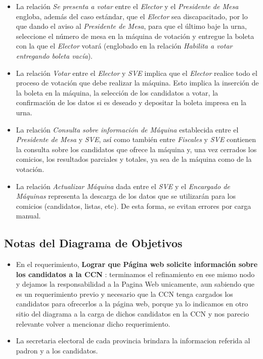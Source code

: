 \documentclass[spanish, 10pt,a4paper]{article}
\numberwithin{equation}{section} %
\begin{document}
\begin{itemize}
\item La relación \textit{Se presenta a votar} entre el \textit{Elector} y el \textit{Presidente de Mesa} engloba, además del caso estándar, que el \textit{Elector} sea discapacitado, por lo que dando el aviso al \textit{Presidente de Mesa}, para que el último baje la urna, seleccione el número de mesa en la máquina de votación y entregue la boleta con la que el \textit{Elector} votará (englobado en la relación \textit{Habilita a votar entregando boleta vacía}).
\item La relación \textit{Votar} entre el \textit{Elector} y \textit{SVE} implica que el \textit{Elector} realice todo el proceso de votación que debe realizar la máquina. Esto implica la inserción de la boleta en la máquina, la selección de los candidatos a votar, la confirmación de los datos si es deseado y depositar la boleta impresa en la urna.
\item La relación \textit{Consulta sobre información de Máquina} establecida entre el \textit{Presidente de Mesa} y \textit{SVE}, así como también entre \textit{Fiscales} y \textit{SVE} contienen la consulta sobre los candidatos que ofrece la máquina y, una vez cerrados los comicios, los resultados parciales y totales, ya sea de la máquina como de la votación.
\item La relación \textit{Actualizar Máquina} dada entre el \textit{SVE} y el \textit{Encargado de Máquinas} representa la descarga de los datos que se utilizarán para los comicios (candidatos, listas, etc). De esta forma, se evitan errores por carga manual.
\end{itemize}

\clearpage

\newpage
\subsection{Notas del Diagrama de Objetivos}
\begin{itemize}
	\item En el requerimiento, \textbf{Lograr que Página web solicite información sobre los candidatos a la CCN} : terminamos el refinamiento en ese mismo nodo y dejamos la responsabilidad a la Pagina Web unicamente, aun sabiendo que es un requerimiento previo y necesario que la CCN tenga cargados los candidatos para ofrecerlos a la página web, porque ya lo indicamos en otro sitio del diagrama a la carga de dichos candidatos en la CCN y nos parecio relevante volver a mencionar dicho requerimiento.
\item  La secretaria electoral de cada provincia brindara la informacion referida al padron y a los candidatos.
\end{itemize}
\end{document}
